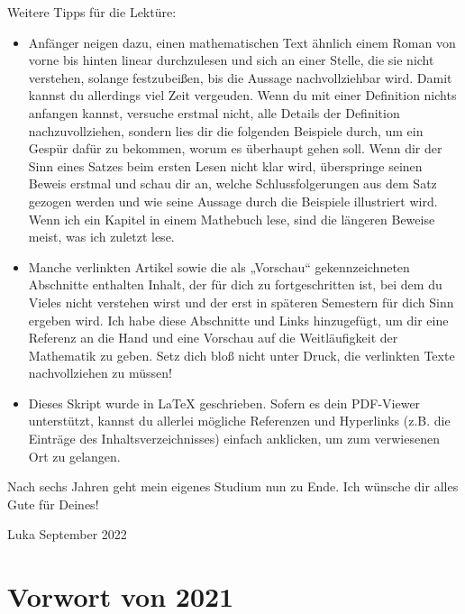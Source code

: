 Weitere Tipps für die Lektüre:
\begin{itemize}
    \item Anfänger neigen dazu, einen mathematischen Text ähnlich einem Roman von vorne bis hinten linear durchzulesen und sich an einer Stelle, die sie nicht verstehen, solange festzubeißen, bis die Aussage nachvollziehbar wird. Damit kannst du allerdings viel Zeit vergeuden. Wenn du mit einer Definition nichts anfangen kannst, versuche erstmal nicht, alle Details der Definition nachzuvollziehen, sondern lies dir die folgenden Beispiele durch, um ein Gespür dafür zu bekommen, worum es überhaupt gehen soll. Wenn dir der Sinn eines Satzes beim ersten Lesen nicht klar wird, überspringe seinen Beweis erstmal und schau dir an, welche Schlussfolgerungen aus dem Satz gezogen werden und wie seine Aussage durch die Beispiele illustriert wird. Wenn ich ein Kapitel in einem Mathebuch lese, sind die längeren Beweise meist, was ich zuletzt lese.
    \item Manche verlinkten Artikel sowie die als „Vorschau“ gekennzeichneten Abschnitte enthalten Inhalt, der für dich zu fortgeschritten ist, bei dem du Vieles nicht verstehen wirst und der erst in späteren Semestern für dich Sinn ergeben wird. Ich habe diese Abschnitte und Links hinzugefügt, um dir eine Referenz an die Hand und eine Vorschau auf die Weitläufigkeit der Mathematik zu geben. Setz dich bloß nicht unter Druck, die verlinkten Texte nachvollziehen zu müssen!
    \item Dieses Skript wurde in {\LaTeX} geschrieben. Sofern es dein PDF-Viewer unterstützt, kannst du allerlei mögliche Referenzen und Hyperlinks (z.B. die Einträge des Inhaltsverzeichnisses) einfach anklicken, um zum verwiesenen Ort zu gelangen.
\end{itemize}
Nach sechs Jahren geht mein eigenes Studium nun zu Ende. Ich wünsche dir alles Gute für Deines!

\quad

Luka \hfill September 2022





\clearpage
\section*{Vorwort von 2021}

